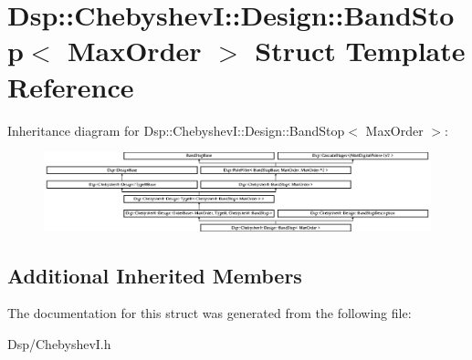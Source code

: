 \hypertarget{structDsp_1_1ChebyshevI_1_1Design_1_1BandStop}{\section{Dsp\-:\-:Chebyshev\-I\-:\-:Design\-:\-:Band\-Stop$<$ Max\-Order $>$ Struct Template Reference}
\label{structDsp_1_1ChebyshevI_1_1Design_1_1BandStop}
}
Inheritance diagram for Dsp\-:\-:Chebyshev\-I\-:\-:Design\-:\-:Band\-Stop$<$ Max\-Order $>$\-:\begin{figure}[H]
\begin{center}
\leavevmode
\includegraphics[height=2.290389cm]{structDsp_1_1ChebyshevI_1_1Design_1_1BandStop}
\end{center}
\end{figure}
\subsection*{Additional Inherited Members}


The documentation for this struct was generated from the following file\-:\begin{DoxyCompactItemize}
\item 
Dsp/Chebyshev\-I.\-h\end{DoxyCompactItemize}
